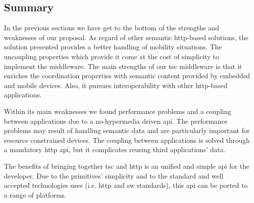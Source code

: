 



\subsection{Summary}
\label{sec:middleware_eval_summary}

In the previous sections we have get to the bottom of the strengths and weaknesses of our proposal.
As regard of other semantic \ac{http}-based solutions, the solution presented provides a better handling of mobility situations. %
The uncoupling properties which provide it come at the cost of simplicity to implement the middleware.
The main strengths of our \ac{tsc} middleware is that it enriches the coordination properties with semantic content provided by embedded and mobile devices.
Also, it pursues interoperability with other \ac{http}-based applications.

Within its main weaknesses we found performance problems and a coupling between applications due to a no-hypermedia driven \ac{api}.
The performance problems may result of handling semantic data and are particularly important for resource constrained devices.
The coupling between applications is solved through a mandatory \ac{http} \ac{api}, but it complicates reusing third applications' data.


The benefits of bringing together \ac{tsc} and \ac{http} is an unified and simple \ac{api} for the developer. %
Due to the primitives' simplicity and to the standard and well accepted technologies uses (i.e. \ac{http} and \ac{sw} standards), this \ac{api} can be ported to a range of platforms.
